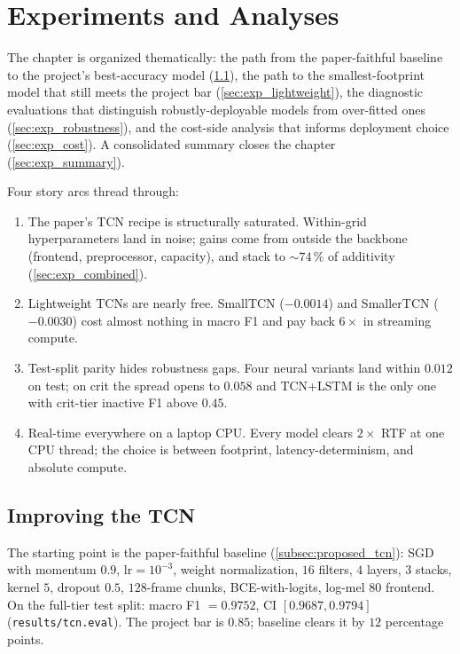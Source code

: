 \chapter{Experiments and Analyses}
\label{cap:experiments}

The chapter is organized thematically: the path from the paper-faithful baseline to the project's best-accuracy model (\cref{sec:exp_improving_tcn}), the path to the smallest-footprint model that still meets the project bar (\cref{sec:exp_lightweight}), the diagnostic evaluations that distinguish robustly-deployable models from over-fitted ones (\cref{sec:exp_robustness}), and the cost-side analysis that informs deployment choice (\cref{sec:exp_cost}).
A consolidated summary closes the chapter (\cref{sec:exp_summary}).

Four story arcs thread through:
\begin{enumerate}
    \item The paper's TCN recipe is structurally saturated. Within-grid hyperparameters land in noise; gains come from outside the backbone (frontend, preprocessor, capacity), and stack to $\sim 74\,\%$ of additivity (\cref{sec:exp_combined}).
    \item Lightweight TCNs are nearly free. SmallTCN ($-0.0014$) and SmallerTCN ($-0.0030$) cost almost nothing in macro F1 and pay back $6\times$ in streaming compute.
    \item Test-split parity hides robustness gaps. Four neural variants land within $0.012$ on test; on crit the spread opens to $0.058$ and TCN+LSTM is the only one with crit-tier inactive F1 above $0.45$.
    \item Real-time everywhere on a laptop CPU. Every model clears $2\times$ RTF at one CPU thread; the choice is between footprint, latency-determinism, and absolute compute.
\end{enumerate}

\section{Improving the TCN}
\label{sec:exp_improving_tcn}

The starting point is the paper-faithful baseline (\cref{subsec:proposed_tcn}): SGD with momentum $0.9$, $\text{lr} = 10^{-3}$, weight normalization, $16$ filters, $4$ layers, $3$ stacks, kernel $5$, dropout $0.5$, $128$-frame chunks, BCE-with-logits, log-mel $80$ frontend.
On the full-tier test split: macro F1 $= 0.9752$, CI $[0.9687, 0.9794]$ (\texttt{results/tcn.eval}).
The project bar is $0.85$; baseline clears it by $12$ percentage points.

